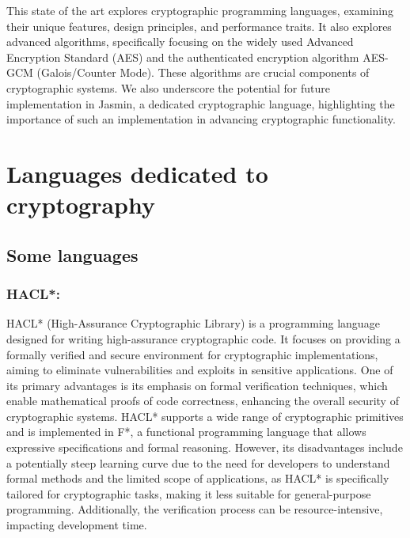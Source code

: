 \documentclass[runningheads]{llncs}
\begin{document}
This state of the art explores cryptographic programming languages, examining their unique features, design principles, and performance traits. It also explores advanced algorithms, specifically focusing on the widely used Advanced Encryption Standard (AES) and the authenticated encryption algorithm AES-GCM (Galois/Counter Mode). These algorithms are crucial components of cryptographic systems. We also underscore the potential for future implementation in Jasmin, a dedicated cryptographic language, highlighting the importance of such an implementation in advancing cryptographic functionality.

\section{Languages dedicated to cryptography}

\subsection{Some languages}
\subsubsection{HACL*:}
HACL*\cite{hacl_star_paper} (High-Assurance Cryptographic Library) is a programming language designed for writing high-assurance cryptographic code. It focuses on providing a formally verified and secure environment for cryptographic implementations, aiming to eliminate vulnerabilities and exploits in sensitive applications. One of its primary advantages is its emphasis on formal verification techniques, which enable mathematical proofs of code correctness, enhancing the overall security of cryptographic systems. HACL* supports a wide range of cryptographic primitives and is implemented in F*, a functional programming language that allows expressive specifications and formal reasoning. However, its disadvantages include a potentially steep learning curve due to the need for developers to understand formal methods and the limited scope of applications, as HACL* is specifically tailored for cryptographic tasks, making it less suitable for general-purpose programming. Additionally, the verification process can be resource-intensive, impacting development time.
\end{document}
